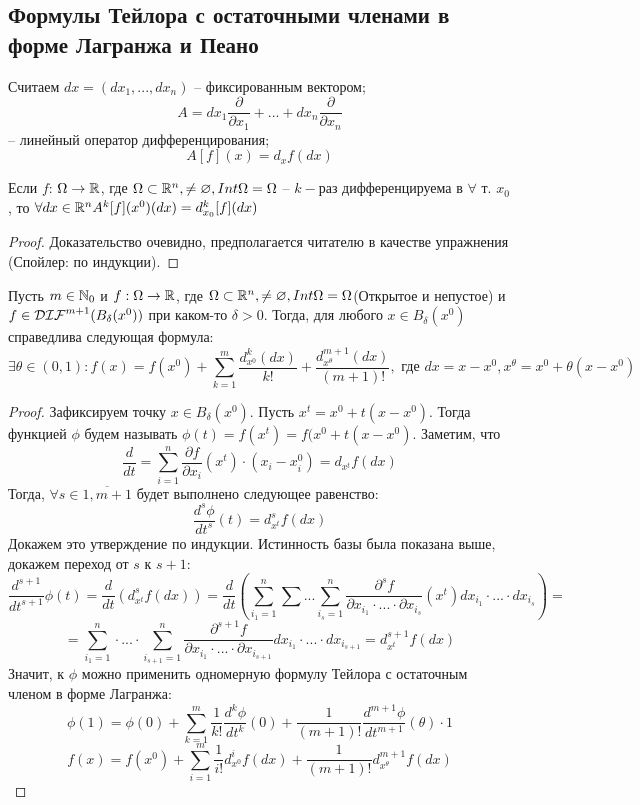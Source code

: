 \subsection{Формулы Тейлора с остаточными членами в форме Лагранжа и Пеано}
\begin{note}
    Считаем $dx = (dx_1, ..., dx_n)$ -- фиксированным вектором;
    \[A = dx_1 \dfrac{\partial}{\partial x_{1}} + ... + dx_n \dfrac{\partial}{\partial x_{n}}\] -- линейный оператор дифференцирования;
    \[A[f](x) = d_x f(dx)\]
\end{note}

\begin{lemma}
    Если $f$: $\Omega \rightarrow \mathbb{R}$, где $\Omega \subset \mathbb{R}^n, \neq \varnothing, Int \Omega = \Omega$ -- $k-$раз дифференцируема в $\forall$ т. $x_0$, то $\forall dx \in \mathbb{R}^n A^k[f](x^0)(dx) = d^k_{x_0}[f](dx)$
\end{lemma}
\begin{proof}
    Доказательство очевидно, предполагается читателю в качестве упражнения (Спойлер: по индукции).
\end{proof}
\begin{theorem}
    Пусть $m \in \mathbb{N}_0$ и $f: \Omega \rightarrow \mathbb{R}$, где $\Omega \subset \mathbb{R}^n, \neq \varnothing, Int \Omega = \Omega$(Открытое и непустое) и $f \in \mathcal{DIF}^{m + 1}(B_{\delta}(x^{0}))$ при каком-то $\delta > 0$. Тогда, для любого $x \in B_{\delta}(x^{0})$ справедлива следующая формула: \[\exists \theta \in (0, 1): f(x) = f(x^0) + \sum\limits_{k = 1}^{m}\frac{d^k_{x^0}(dx)}{k!} + \frac{d^{m + 1}_{x^{\theta}}(dx)}{(m + 1)!}, \text{ где }dx = x - x^0, x^{\theta} = x^0 + \theta(x - x^0)\]
\end{theorem}
\begin{proof}
    Зафиксируем точку $x \in B_{\delta}(x^0)$. Пусть $x^t = x^0 + t(x - x^0)$. Тогда функцией $\phi$ будем называть $\phi(t) = f(x^t) = f(x^0 + t(x - x^0)$. Заметим, что \[\dfrac{d}{dt} = \sum\limits_{i = 1}^n \dfrac{\partial f}{\partial x_i}(x^t) \cdot (x_i - x^0_i) = d_{x^t}f(dx)\]
    Тогда, $\forall s \in \overline{1, m + 1}$ будет выполнено следующее равенство: \[\dfrac{d^s \phi}{d t^s}(t) = d^s_{x^t} f(dx)\]
    Докажем это утверждение по индукции. Истинность базы была показана выше, докажем переход от $s$ к $s + 1$:
    \[\dfrac{d^{s + 1}}{dt^{s + 1}} \phi(t) = \dfrac{d}{dt}(d^s_{x^t} f(dx)) = \dfrac{d}{dt} (\sum\limits_{i_1 = 1}^n\sum ... \sum\limits_{i_s = 1}^n \dfrac{\partial^sf}{\partial x_{i_1} \cdot ... \cdot \partial x_{i_s}}(x^t)dx_{i_1}\cdot ... \cdot dx_{i_s}) =\]
    \[= \sum\limits_{i_1 = 1}^n \cdot ... \cdot \sum\limits_{i_{s + 1} = 1}^n \dfrac{\partial^{s + 1}f}{\partial x_{i_1}\cdot ... \cdot \partial x_{i_{s + 1}}}dx_{i_1}\cdot...\cdot dx_{i_{s+1}} = d^{s + 1}_{x^t} f(dx)\]
    Значит, к $\phi$ можно применить одномерную формулу Тейлора с остаточным членом в форме Лагранжа:
    \[\phi(1) = \phi(0) + \sum\limits_{k = 1}^m \frac{1}{k!} \dfrac{d^k \phi}{dt^k}(0) + \frac{1}{(m + 1)!} \dfrac{d^{m + 1}\phi}{dt^{m + 1}}(\theta) \cdot 1\]
    \[f(x) = f(x^0) + \sum\limits_{i = 1}^m \frac{1}{i!} d_{x^0}^if(dx) + \frac{1}{(m + 1)!}d_{x^\theta}^{m + 1}f(dx)\]
\end{proof}

